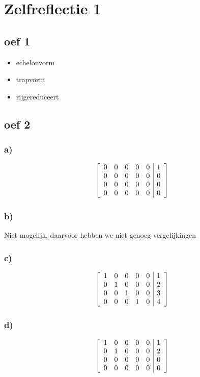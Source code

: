\documentclass[lineaire_algebra_oplossingen.tex]{subfiles}
\begin{document}
\section{Zelfreflectie 1}
\subsection{oef 1}
\begin{itemize}
\item echelonvorm
\item trapvorm
\item rijgereduceert
\end{itemize}
\subsection{oef 2}
\subsubsection*{a)}
\[
\left[
\begin{array}{l l l l l | r}
0 & 0 & 0 & 0 & 0 & 1\\
0 & 0 & 0 & 0 & 0 & 0\\
0 & 0 & 0 & 0 & 0 & 0\\
0 & 0 & 0 & 0 & 0 & 0\\
\end{array}
\right]
\]
\subsubsection*{b)}
Niet mogelijk, daarvoor hebben we niet genoeg vergelijkingen
\subsubsection*{c)}
\[
\left[
\begin{array}{l l l l l | r}
1 & 0 & 0 & 0 & 0 & 1\\
0 & 1 & 0 & 0 & 0 & 2\\
0 & 0 & 1 & 0 & 0 & 3\\
0 & 0 & 0 & 1 & 0 & 4\\
\end{array}
\right]
\]
\subsubsection*{d)}
\[
\left[
\begin{array}{l l l l l | r}
1 & 0 & 0 & 0 & 0 & 1\\
0 & 1 & 0 & 0 & 0 & 2\\
0 & 0 & 0 & 0 & 0 & 0\\
0 & 0 & 0 & 0 & 0 & 0\\
\end{array}
\right]
\]
\end{document}
